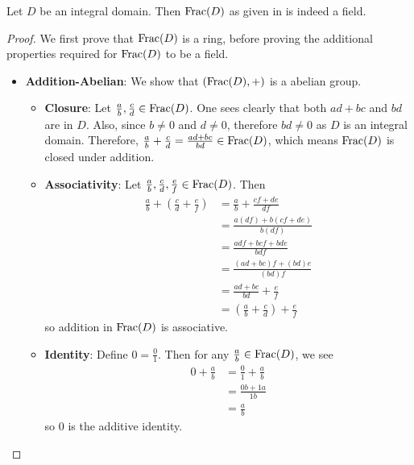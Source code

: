 \begin{proposition}
    Let $D$ be an integral domain. Then $\mathrm{Frac}(D)$ as given in  is indeed a field.
\end{proposition}
\begin{proof}
    We first prove that $\mathrm{Frac}(D)$ is a ring, before proving the additional properties required for $\mathrm{Frac}(D)$ to be a field.
    \begin{itemize}
        \item \textbf{Addition-Abelian}: We show that $(\mathrm{Frac}(D), +)$ is a abelian group.
        \begin{itemize}
            \item \textbf{Closure}: Let $\frac ab, \frac cd \in \mathrm{Frac}(D)$. One sees clearly that both $ad + bc$ and $bd$ are in $D$. Also, since $b \neq 0$ and $d \neq 0$, therefore $bd \neq 0$ as $D$ is an integral domain. Therefore, $\frac ab + \frac cd = \frac{ad + bc}{bd} \in \mathrm{Frac}(D)$, which means $\mathrm{Frac}(D)$ is closed under addition.
            
            \item \textbf{Associativity}: Let $\frac ab, \frac cd, \frac ef \in \mathrm{Frac}(D)$. Then
            \begin{align*}
                \frac ab + \left(\frac cd + \frac ef\right) &= \frac ab + \frac {cf + de}{df}\\
                &= \frac{a(df) + b(cf + de)}{b(df)}\\
                &= \frac{adf + bcf + bde}{bdf}\\
                &= \frac{(ad + bc)f + (bd)e}{(bd)f}\\
                &= \frac{ad+bc}{bd} + \frac ef\\
                &= \left(\frac ab + \frac cd\right) + \frac ef
            \end{align*}
            so addition in $\mathrm{Frac}(D)$ is associative.
            
            \item \textbf{Identity}: Define $0 = \frac 01$. Then for any $\frac ab \in \mathrm{Frac}(D)$, we see
            \begin{align*}
                0 + \frac ab &= \frac 01 + \frac ab\\
                &= \frac{0b + 1a}{1b}\\
                &= \frac ab
            \end{align*}
            so 0 is the additive identity.
            

\end{itemize}
\end{itemize}
\end{proof}
